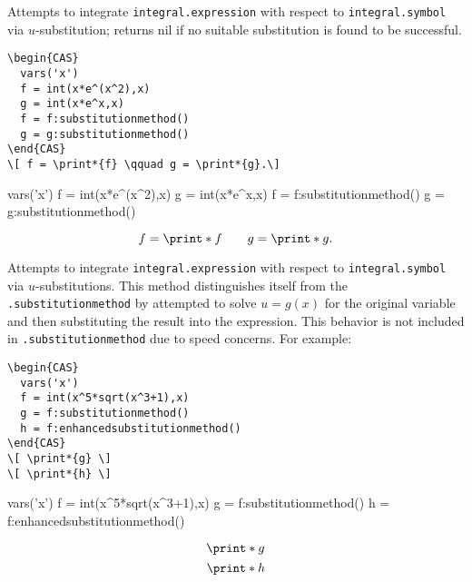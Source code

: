 
Attempts to integrate \texttt{integral.expression} with respect to \texttt{integral.symbol} via $u$-substitution; returns nil if no suitable substitution is found to be successful.

\begin{codebox}
    \begin{verbatim}
\begin{CAS}
  vars('x')
  f = int(x*e^(x^2),x)
  g = int(x*e^x,x)
  f = f:substitutionmethod()
  g = g:substitutionmethod()
\end{CAS}
\[ f = \print*{f} \qquad g = \print*{g}.\]
\end{verbatim}
\tcblower
\begin{CAS}
  vars('x')
  f = int(x*e^(x^2),x)
  g = int(x*e^x,x)
  f = f:substitutionmethod()
  g = g:substitutionmethod()
\end{CAS}
\[ f = \print*{f} \qquad g = \print*{g}.\]
\end{codebox}


Attempts to integrate \texttt{integral.expression} with respect to \texttt{integral.symbol} via $u$-substitutions. This method distinguishes itself from the \texttt{.substitutionmethod} by attempted to solve $u= g(x)$ for the original variable and then substituting the result into the expression. This behavior is not included in \texttt{.substitutionmethod} due to speed concerns. For example:

\begin{codebox}
    \begin{verbatim}
\begin{CAS}
  vars('x')
  f = int(x^5*sqrt(x^3+1),x)
  g = f:substitutionmethod()
  h = f:enhancedsubstitutionmethod()
\end{CAS}
\[ \print*{g} \]
\[ \print*{h} \]
\end{verbatim}
\tcblower
\begin{CAS}
    vars('x')
    f = int(x^5*sqrt(x^3+1),x)
    g = f:substitutionmethod()
    h = f:enhancedsubstitutionmethod()
\end{CAS}
\[ \print*{g} \]
\[ \print*{h} \]
\end{codebox}


